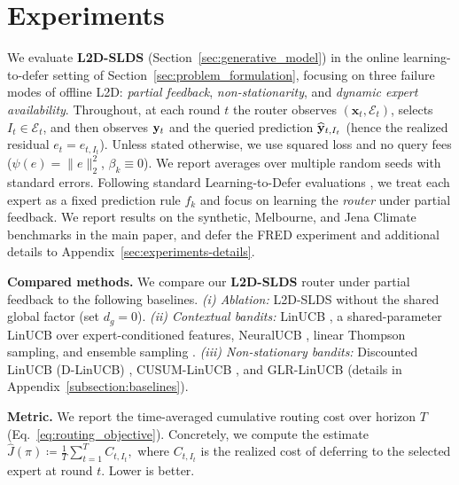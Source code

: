 \section{Experiments}
\label{sec:experiments}

We evaluate \textbf{L2D-SLDS} (Section~\ref{sec:generative_model}) in the
online learning-to-defer setting of Section~\ref{sec:problem_formulation}, focusing on three failure modes
of offline L2D: \emph{partial feedback}, \emph{non-stationarity}, and \emph{dynamic expert
availability}. Throughout, at each round \(t\) the router observes \((\mathbf{x}_t,\mathcal{E}_t)\),
selects \(I_t\in\mathcal{E}_t\), and then observes \(\mathbf{y}_t\) and the queried prediction
\(\widehat{\mathbf{y}}_{t,I_t}\) (hence the realized residual \(e_t=e_{t,I_t}\)). Unless stated otherwise, we
use squared loss and no query fees (\(\psi(e)=\lVert e\rVert_2^2\), \(\beta_k\equiv 0\)). We report
averages over multiple random seeds with standard errors.
Following standard Learning-to-Defer evaluations
\citep{mozannar2021consistent, Narasimhan, mao2023twostage, montreuil2024twostagelearningtodefermultitasklearning}, we
treat each expert as a fixed prediction rule \(f_k\) and focus on learning the \emph{router} under
partial feedback. We report results on the synthetic, Melbourne, and Jena Climate benchmarks in the main paper, and
defer the FRED experiment and additional details to Appendix~\ref{sec:experiments-details}.


\textbf{Compared methods.}
We compare our \textbf{L2D-SLDS} router under partial feedback to the following baselines.
\emph{(i) Ablation:} L2D-SLDS without the shared global factor (set \(d_g=0\)).
\emph{(ii) Contextual bandits:} LinUCB \citep{li2010contextual}, a shared-parameter LinUCB over
expert-conditioned features, NeuralUCB \citep{zhou2020neuralcontextualbanditsucbbased}, linear
Thompson sampling, and ensemble sampling \citep{lu2017ensemble}.
\emph{(iii) Non-stationary bandits:} Discounted LinUCB (D-LinUCB) \citep{russac2019weighted},
CUSUM-LinUCB \citep{liu2018change}, and GLR-LinUCB \citep{besson2022efficient}
(details in Appendix~\ref{subsection:baselines}).

\textbf{Metric.}
We report the time-averaged cumulative routing cost over horizon \(T\) (Eq.~\eqref{eq:routing_objective}). Concretely, we
compute the estimate
\(
\hat{J}(\pi) \coloneqq \frac{1}{T}\sum_{t=1}^T C_{t,I_t},
\)
where \(C_{t,I_t}\) is the realized cost of deferring to the selected expert at round \(t\). Lower is better.



